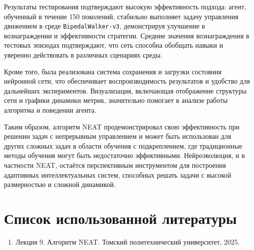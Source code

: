 \documentclass[a4paper,12pt]{article}
\begin{document}
Результаты тестирования подтверждают высокую эффективность подхода: агент, обученный в течение 150 поколений, стабильно выполняет задачу управления движением в среде \texttt{BipedalWalker-v3}, демонстрируя улучшение в вознаграждении и эффективности стратегии. Средние значения вознаграждения в тестовых эпизодах подтверждают, что сеть способна обобщать навыки и уверенно действовать в различных сценариях среды.

Кроме того, была реализована система сохранения и загрузки состояния нейронной сети, что обеспечивает воспроизводимость результатов и удобство для дальнейших экспериментов. Визуализация, включающая отображение структуры сети и графики динамики метрик, значительно помогает в анализе работы алгоритма и поведении агента.

Таким образом, алгоритм NEAT продемонстрировал свою эффективность при решении задач с непрерывным управлением и может быть использован для других сложных задач в области обучения с подкреплением, где традиционные методы обучения могут быть недостаточно эффективными. Нейроэволюция, и в частности NEAT, остаётся перспективным инструментом для построения адаптивных интеллектуальных систем, способных решать задачи с высокой размерностью и сложной динамикой.
\newpage
\section*{Список использованной литературы}
\begin{enumerate}
    \item Лекция 9. Алгоритм NEAT. Томский политехнический университет, 2025.
\end{enumerate}
\end{document}

